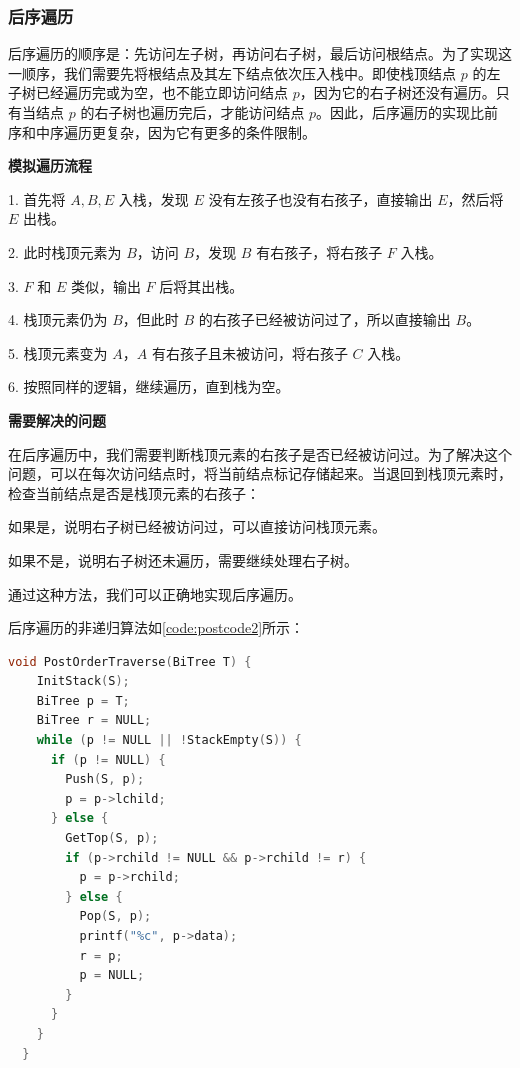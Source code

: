 \documentclass[lang=cn,newtx,10pt,scheme=chinese]{../elegantbook}
\begin{document}
\subsubsection{后序遍历}

后序遍历的顺序是：先访问左子树，再访问右子树，最后访问根结点。为了实现这一顺序，我们需要先将根结点及其左下结点依次压入栈中。即使栈顶结点 $p$ 的左子树已经遍历完或为空，也不能立即访问结点 $p$，因为它的右子树还没有遍历。只有当结点 $p$ 的右子树也遍历完后，才能访问结点 $p$。因此，后序遍历的实现比前序和中序遍历更复杂，因为它有更多的条件限制。

\textbf{模拟遍历流程}

1. 首先将 $A, B, E$ 入栈，发现 $E$ 没有左孩子也没有右孩子，直接输出 $E$，然后将 $E$ 出栈。

2. 此时栈顶元素为 $B$，访问 $B$，发现 $B$ 有右孩子，将右孩子 $F$ 入栈。

3. $F$ 和 $E$ 类似，输出 $F$ 后将其出栈。

4. 栈顶元素仍为 $B$，但此时 $B$ 的右孩子已经被访问过了，所以直接输出 $B$。

5. 栈顶元素变为 $A$，$A$ 有右孩子且未被访问，将右孩子 $C$ 入栈。

6. 按照同样的逻辑，继续遍历，直到栈为空。

\textbf{需要解决的问题}

在后序遍历中，我们需要判断栈顶元素的右孩子是否已经被访问过。为了解决这个问题，可以在每次访问结点时，将当前结点标记存储起来。当退回到栈顶元素时，检查当前结点是否是栈顶元素的右孩子：

如果是，说明右子树已经被访问过，可以直接访问栈顶元素。

如果不是，说明右子树还未遍历，需要继续处理右子树。

通过这种方法，我们可以正确地实现后序遍历。

后序遍历的非递归算法如\ref{code:postcode2}所示：

\begin{lstlisting}[language=C++, caption={后序遍历}, label={code:postcode2}]
  void PostOrderTraverse(BiTree T) {
    InitStack(S);
    BiTree p = T;
    BiTree r = NULL;
    while (p != NULL || !StackEmpty(S)) {
      if (p != NULL) {
        Push(S, p);
        p = p->lchild;
      } else {
        GetTop(S, p);
        if (p->rchild != NULL && p->rchild != r) {
          p = p->rchild;
        } else {
          Pop(S, p);
          printf("%c", p->data);
          r = p;
          p = NULL;
        }
      }
    }
  }
\end{lstlisting}
\end{document}
